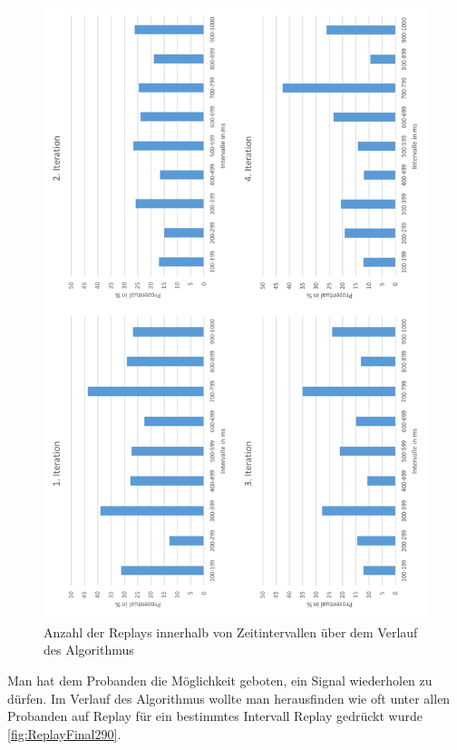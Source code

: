 \begin{figure}[htbp] 
            \centering
   	\includegraphics[width=\textwidth]{pics/analyse/algo/Replay/ReplayFinal290.png}
	\caption{Anzahl der Replays innerhalb von Zeitintervallen {\"u}ber dem Verlauf des Algorithmus}
	\label{fig:ReplayFinal290}
\end{figure}

Man hat dem Probanden die M{\"o}glichkeit geboten, ein Signal wiederholen zu d{\"u}rfen. 
Im Verlauf des Algorithmus wollte man herausfinden wie oft unter allen Probanden auf Replay f{\"u}r ein bestimmtes Intervall Replay gedr{\"u}ckt wurde \autoref{fig:ReplayFinal290}. 

